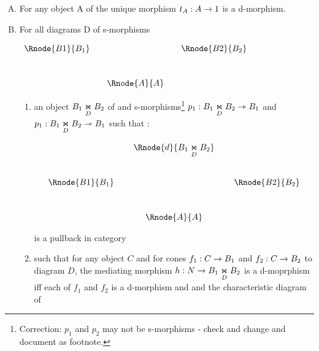 \documentclass[10pt,a4paper]{scrartcl}
\begin{document}
\begin{enumerate} [A.,leftmargin=0.5cm]
	\item For any object A of  the unique morphism $t_A:A \morph 1$ is a d-morphism.
	
	
	\item For all diagrams D of s-morphisms 
	\begin{center}
$
\begin{array}{cp{0cm}cp{0cm}c}
\Rnode{B1}{B_1}& &            &  &\Rnode{B2}{B_2} \\ [1.0cm]
               & &\Rnode{A}{A}& &
\end{array}
$
\end{center}
\begin{enumerate}[label*=\arabic*]
\item	
an object  $ \fibrex{B_1}{B_2}{D}$ of  and s-morphisms\footnote{Correction: $p_1$ and $p_2$ may not be s-morphisms - check and change and document as footnote.} 
$p_1: \fibrex{B_1}{B_2}{D} \smorph B_1$ and  $p_1: \fibrex{B_1}{B_2}{D} \smorph B_1$ such that :

\begin{center}
\begin{displaymath}
\begin{array}{cp{0.1cm}cp{0.1cm} c}
            & &\Rnode{d}{\fibrex{B_1}{B_2}{D}}                  \\ [1.0cm]
\Rnode{B1}{B_1}& &                & & \Rnode{B2}{B_2}           \\ [1.0cm]
                   & &\Rnode{A}{A}& &
\end{array}
\end{displaymath}
 
\end{center}

is a pullback in category 

\item \label{mediatingone} such that for any 
object $C$ and for cones $f_1:C \morph B_1$ and $f_2:C \morph B_2$ to diagram $D$,
the mediating morphism $h: N \morph B_1 \underset{D}{\Join} B_2$ is a d-moprphism iff 
each of $f_1$ and $f_2$  is a d-morphism and and the characteristic diagram of


\end{enumerate}
\end{enumerate}
\end{document}
